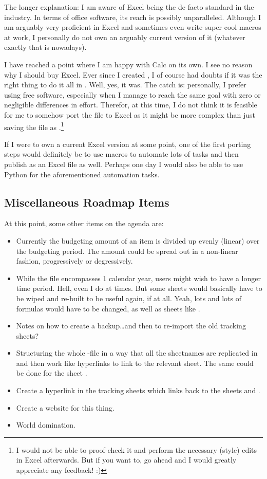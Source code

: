 The longer explanation:
I am aware of Excel being the de facto standard in the industry.
In terms of office software, its reach is possibly unparalleled.
Although I am arguably very proficient in Excel and sometimes even write super cool macros at work, I personally do not own an arguably current version of it (whatever exactly that is nowadays).

I have reached a point where I am happy with Calc on its own.
I see no reason why I should buy Excel.
Ever since I created \tfn, I of course had doubts if it was the right thing to do it all in \loc.
Well, yes, it was.
The catch is: personally, I prefer using free software, especially when I manage to reach the same goal with zero or negligible differences in effort.
Therefor, at this time, I do not think it is feasible for me to somehow port the file to Excel as it might be more complex than just saving the file as .\footnote{I would not be able to proof-check it and perform the necessary (style) edits in Excel afterwards.
But if you want to, go ahead and I would greatly appreciate any feedback! :)}

If I were to own a current Excel version at some point, one of the first porting steps would definitely be to use macros to automate lots of tasks and then publish \tfn as an Excel file as well.
Perhaps one day I would also be able to use Python for the aforementioned automation tasks.

\subsection{Miscellaneous Roadmap Items}
\label{subsec:misc-roadmap-items}

At this point, some other items on the agenda are:
\begin{itemize}
	\item Currently the budgeting amount of an item is divided up evenly (\ie linear) over the budgeting period.
	The amount could be spread out in a non-linear fashion, \eg progressively or degressively.
	\item While the file encompasses 1 calendar year, users might wish to have a longer time period.
	Hell, even I do at times.
	But some sheets would basically have to be wiped and re-built to be useful again, if at all.
	Yeah, lots and lots of formulas would have to be changed, as well as sheets like .
	\item Notes on how to create a backup\ldots and then to re-import the old tracking sheets?
	\item Structuring the whole -file in a way that all the sheetnames are replicated in  and then work like hyperlinks to link to the relevant sheet.
	The same could be done for the sheet .
	\item Create a hyperlink in the tracking sheets which links back to the sheets  and .
	\item Create a website for this thing.
	\item World domination.
\end{itemize}